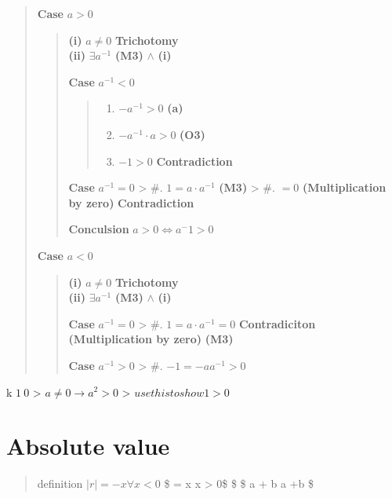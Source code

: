 \documentclass{tufte-handout}
\providecommand{\tightlist}{%
  \setlength{\itemsep}{0pt}\setlength{\parskip}{0pt}}
\begin{document}
\begin{quote}
\textbf{Case} \(a > 0\)

\begin{quote}
\textbf{(i)} \(a \neq 0\) \textbf{Trichotomy}\\
\textbf{(ii)} \(\exists a^{-1}\) \textbf{(M3)} \(\wedge\) \textbf{(i)}

\textbf{Case} \(a^{-1} < 0\)

\begin{quote}
\begin{enumerate}
\tightlist
\item
  \(-a^{-1} > 0\) \textbf{(a)}
\item
  \(-a^{-1} \cdot a > 0\) \textbf{(O3)}
\item
  \(-1 > 0\) \textbf{Contradiction}
\end{enumerate}
\end{quote}

\textbf{Case} \(a^{-1} = 0\) \textgreater{} \#. \(1 = a \cdot a^{-1}\)
\textbf{(M3)} \textgreater{} \#. \(= 0\) \textbf{(Multiplication by
zero)} \textbf{Contradiction}

\textbf{Conculsion} \(a > 0 \Leftrightarrow a^-1 >0\)
\end{quote}

\textbf{Case} \(a < 0\)

\begin{quote}
\textbf{(i)} \(a \neq 0\) \textbf{Trichotomy}\\
\textbf{(ii)} \(\exists a^{-1}\) \textbf{(M3)} \(\wedge\) \textbf{(i)}

\textbf{Case} \(a^{-1} = 0\) \textgreater{} \#.
\(1 = a \cdot a^{-1} = 0\) \textbf{Contradiciton}
\textbf{(Multiplication by zero)} \textbf{(M3)}

\textbf{Case} \(a^{-1} > 0\) \textgreater{} \#. \(-1 = -a a^{-1} > 0\)
\end{quote}
\end{quote}

k \(1 \> 0\) \textgreater{} \(a \neq 0 \to a^2 > 0\) \textgreater{}
\(use this to show 1 > 0\)

\hypertarget{absolute-value}{%
\section{Absolute value}\label{absolute-value}}

\begin{quote}
definition \(|r| = -x \forall x < 0\) \$ = x \quad x \textgreater{} 0\$
\$\infty \nin {} \$ a + b \leq \textbar{} a +b \$
\end{quote}
\end{document}
